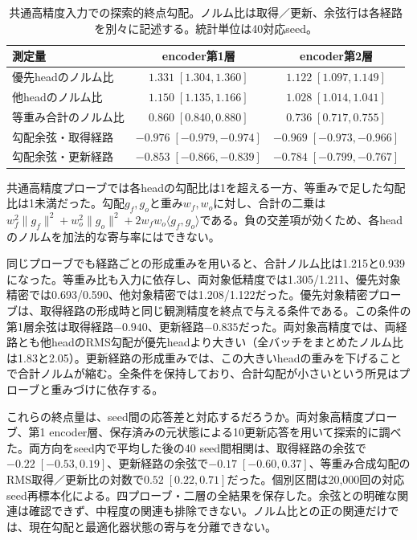 \begin{table}[ht]
\centering\small
\caption{共通高精度入力での探索的終点勾配。ノルム比は取得／更新、余弦行は各経路を別々に記述する。統計単位は40対応seed。}
\label{tab:headgrad}
\begin{tabular}{lcc}
\toprule
測定量 & encoder第1層 & encoder第2層\\
\midrule
優先headのノルム比 & $1.331\;[1.304,1.360]$ & $1.122\;[1.097,1.149]$\\
他headのノルム比 & $1.150\;[1.135,1.166]$ & $1.028\;[1.014,1.041]$\\
等重み合計のノルム比 & $0.860\;[0.840,0.880]$ & $0.736\;[0.717,0.755]$\\
勾配余弦・取得経路 & $-0.976\;[-0.979,-0.974]$ & $-0.969\;[-0.973,-0.966]$\\
勾配余弦・更新経路 & $-0.853\;[-0.866,-0.839]$ & $-0.784\;[-0.799,-0.767]$\\
\bottomrule
\end{tabular}
\end{table}

共通高精度プローブでは各headの勾配比は1を超える一方、等重みで足した勾配比は1未満だった。勾配$g_f,g_o$と重み$w_f,w_o$に対し、合計の二乗は$w_f^2\|g_f\|^2+w_o^2\|g_o\|^2+2w_fw_o\langle g_f,g_o\rangle$である。負の交差項が効くため、各headのノルムを加法的な寄与率にはできない。

同じプローブでも経路ごとの形成重みを用いると、合計ノルム比は1.215と0.939になった。等重み比も入力に依存し、両対象低精度では1.305/1.211、優先対象精密では0.693/0.590、他対象精密では1.208/1.122だった。優先対象精密プローブは、取得経路の形成時と同じ観測精度を終点で与える条件である。この条件の第1層余弦は取得経路$-0.940$、更新経路$-0.835$だった。両対象高精度では、両経路とも他headのRMS勾配が優先headより大きい（全バッチをまとめたノルム比は1.83と2.05）。更新経路の形成重みでは、この大きいheadの重みを下げることで合計ノルムが縮む。全条件を保持しており、合計勾配が小さいという所見はプローブと重みづけに依存する。

これらの終点量は、seed間の応答差と対応するだろうか。両対象高精度プローブ、第1 encoder層、保存済みの元状態による10更新応答を用いて探索的に調べた。両方向をseed内で平均した後の40 seed間相関は、取得経路の余弦で$-0.22\;[-0.53,0.19]$、更新経路の余弦で$-0.17\;[-0.60,0.37]$、等重み合成勾配のRMS取得／更新比の対数で$0.52\;[0.22,0.71]$だった。個別区間は20,000回の対応seed再標本化による。四プローブ・二層の全結果を保存した。余弦との明確な関連は確認できず、中程度の関連も排除できない。ノルム比との正の関連だけでは、現在勾配と最適化器状態の寄与を分離できない。

